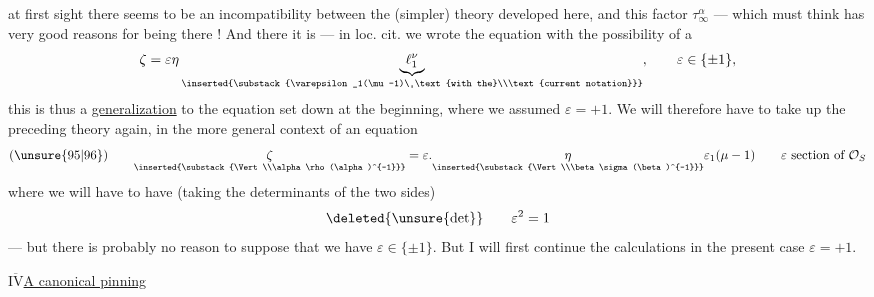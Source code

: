 
at first sight there seems to be an incompatibility between the (simpler) theory developed here, and this factor $\tau_\infty^\alpha$ --- which  must think has very good reasons for being there ! And there it is --- in loc. cit. we wrote the equation   with the possibility of a 
\[
\zeta=\varepsilon\eta
\underbrace{\ell_1^\nu}_{\inserted{\substack{\varepsilon_1(\mu-1)\ \text{with the}\\\text{current notation}}}},
\qquad\varepsilon\in\{\pm1\},
\]
this is thus a \uline{generalization}  to the equation set down at the beginning, where we assumed $\varepsilon=+1$.
We will therefore have to  take up the preceding theory again, in the more general context of an equation
\[
(\unsure{95|96})\qquad
\underset{\inserted{\substack{\Vert\\\alpha\rho(\alpha)^{-1}}}}{\zeta}
=\varepsilon.\underset{\inserted{\substack{\Vert\\\beta\sigma(\beta)^{-1}}}}{\eta}\varepsilon_1(\mu-1)
\qquad\varepsilon\ \text{section of }\mathcal O_S
\]
where we will have to have (taking the determinants of the two sides) 
\[
\deleted{\unsure{\det}}\qquad\varepsilon^2=1
\]
--- but there is probably no reason to suppose that we have $\varepsilon\in\{\pm1\}$. But I will first continue the calculations in the present case $\varepsilon=+1$.



\uline{$\overline{\mathrm{IV}}$}\qquad\uline{A canonical pinning}

